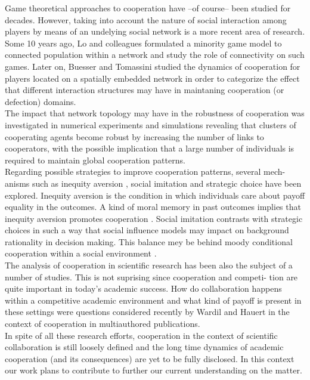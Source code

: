 Game theoretical approaches to cooperation have –of course– been
studied for decades. However, taking into account the nature of social
interaction among players by means of an undelying social network is a
more recent area of research. Some 10 years ago, Lo and colleagues
\cite{Lo2004} formulated a minority game model to connected population
within a network and study the role of connectivity on such games.
Later on, Buesser and Tomassini \cite{Buesser2012} studied the
dynamics of cooperation for players located on a spatially embedded
network in order to categorize the effect that different interaction
structures may have in maintaning cooperation (or defection) domains.\\

The impact that network topology may have in the robustness of
cooperation was investigated in numerical experiments and simulations
\cite{Ichinose2013} revealing that clusters of cooperating agents become robust by
increasing the number of links to cooperators, with the possible
implication that a large number of individuals is required to maintain
global cooperation patterns.\\

Regarding possible strategies to improve cooperation patterns, several mech-
anisms such as inequity aversion \cite{Ahmed2014}, social imitation
and strategic choice \cite{Vilone2014} have been explored. Inequity
aversion is the condition in which individuals care about payoff
equality in the outcomes. A kind of moral memory in past outcomes
implies that inequity aversion promotes cooperation
\cite{Ahmed2014}. Social imitation contrasts with strategic choices
in such a way that social influence models may impact on background
rationality in decision making. This balance mey be behind moody
conditional cooperation within a social environment \cite{Vilone2014}.\\

The analysis of cooperation in scientific research has been also the subject
of a number of studies. This is not suprising since cooperation and competi-
tion are quite important in today’s academic success. How do collaboration
happens within a competitive academic environment and what kind of payoff
is present in these settings were questions considered recently by Wardil and
Hauert \cite{Wardil2015} in the context of cooperation in multiauthored
publications.\\

In spite of all these research efforts, cooperation in the context of scientific
collaboration is still loosely defined and the long time dynamics of academic
cooperation (and its consequences) are yet to be fully disclosed. In this context
our work plans to contribute to further our current understanding on the
matter.

